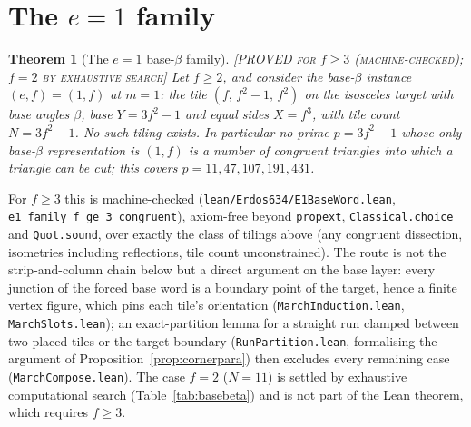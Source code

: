 \documentclass[11pt,reqno]{amsart}
\theoremstyle{plain}
\newtheorem{theorem}{Theorem}
\theoremstyle{definition}
\newcommand{\lab}[1]{\hfill\textnormal{\footnotesize\textsc{[#1]}}}
\begin{document}
\section{The $e=1$ family}\label{sec:compe1}

\begin{theorem}[The $e=1$ base-$\beta$ family]\label{thm:e1family}\lab{PROVED for $f\ge3$ (machine-checked); $f=2$ by exhaustive search}
Let $f\ge 2$, and consider the base-$\beta$ instance $(e,f)=(1,f)$ at $m=1$: the tile
$(f,\,f^2-1,\,f^2)$ on the isosceles target with base angles $\beta$, base $Y=3f^2-1$ and equal
sides $X=f^3$, with tile count $N=3f^2-1$. No such tiling exists. In particular no prime
$p=3f^2-1$ whose only base-$\beta$ representation is $(1,f)$ is a number of congruent triangles
into which a triangle can be cut; this covers $p=11,47,107,191,431$.
\end{theorem}

For $f\ge3$ this is machine-checked
(\texttt{lean/Erdos634/E1BaseWord.lean}, \texttt{e1\_family\_f\_ge\_3\_congruent}), axiom-free
beyond \texttt{propext}, \texttt{Classical.choice} and \texttt{Quot.sound}, over exactly the class
of tilings above (any congruent dissection, isometries including reflections, tile count
unconstrained). The route is not the strip-and-column chain below but a direct argument on the
base layer: every junction of the forced base word is a boundary point of the target, hence a
finite vertex figure, which pins each tile's orientation (\texttt{MarchInduction.lean},
\texttt{MarchSlots.lean}); an exact-partition lemma for a straight run clamped between two placed
tiles or the target boundary (\texttt{RunPartition.lean}, formalising the argument of
Proposition~\ref{prop:cornerpara}) then excludes every remaining case
(\texttt{MarchCompose.lean}). The case $f=2$ ($N=11$) is settled by exhaustive computational search
(Table~\ref{tab:basebeta}) and is not part of the Lean theorem, which requires $f\ge3$.
\end{document}
